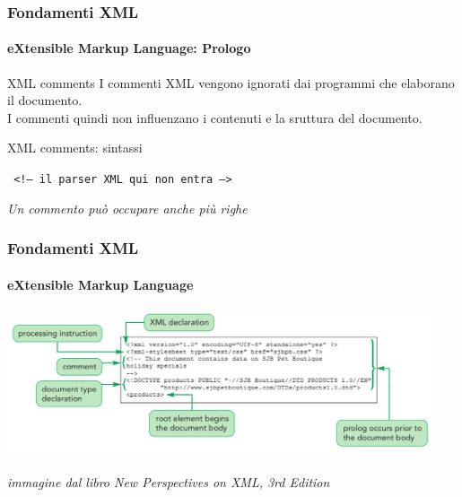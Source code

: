 \begin{frame}
	\frametitle{Fondamenti XML}
	\framesubtitle{eXtensible Markup Language: Prologo}
	\addtocounter{nframe}{1}

	\begin{block}{XML comments}
		I commenti XML vengono ignorati dai programmi che elaborano il documento.
		\\I commenti quindi non influenzano i contenuti e la sruttura del documento.
	\end{block}

	\begin{block}{XML comments: sintassi}
	\begin{center}\texttt{
		<!-- il parser XML qui non entra -->
	}\end{center}
	\end{block}

	\textit{Un commento può occupare anche più righe}
	
\end{frame}

\begin{frame}
	\frametitle{Fondamenti XML}
	\framesubtitle{eXtensible Markup Language}
	\addtocounter{nframe}{1}

	\begin{center}
		\includegraphics[width=0.95\textwidth]{imgs/XML-Prologo.png}
    \end{center}
\begin{tiny}\textit{immagine dal libro New Perspectives on XML, 3rd Edition}\end{tiny}

\end{frame}

